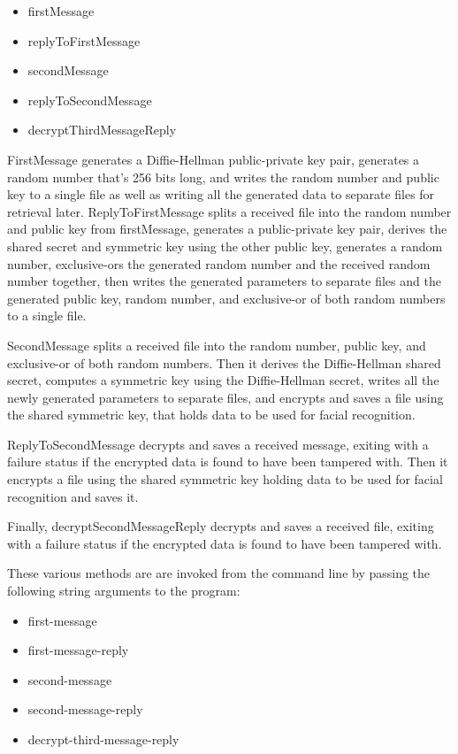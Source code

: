 \documentclass[12pt]{report}
\begin{document}
\begin{itemize}
    \item firstMessage
    \item replyToFirstMessage
    \item secondMessage
    \item replyToSecondMessage
    \item decryptThirdMessageReply
\end{itemize}

FirstMessage generates a Diffie-Hellman public-private key pair, generates a random number that's 256 bits long, and writes the random number and public key to a single file as well as writing all the generated data to separate files for retrieval later. ReplyToFirstMessage splits a received file into the random number and public key from firstMessage, generates a public-private key pair, derives the shared secret and symmetric key using the other public key, generates a random number, exclusive-ors the generated random number and the received random number together, then writes the generated parameters to separate files and the generated public key, random number, and exclusive-or of both random numbers to a single file. \par

SecondMessage splits a received file into the random number, public key, and exclusive-or of both random numbers. Then it derives the Diffie-Hellman shared secret, computes a symmetric key using the Diffie-Hellman secret, writes all the newly generated parameters to separate files, and encrypts and saves a file using the shared symmetric key, that holds data to be used for facial recognition. \par

ReplyToSecondMessage decrypts and saves a received message, exiting with a failure status if the encrypted data is found to have been tampered with. Then it encrypts a file using the shared symmetric key holding data to be used for facial recognition and saves it. \par

Finally, decryptSecondMessageReply decrypts and saves a received file, exiting with a failure status if the encrypted data is found to have been tampered with. \par

These various methods are are invoked from the command line by passing the following string arguments to the program: 

\begin{itemize}
    \item first-message
    \item first-message-reply
    \item second-message
    \item second-message-reply
    \item decrypt-third-message-reply
\end{itemize}
\end{document}
